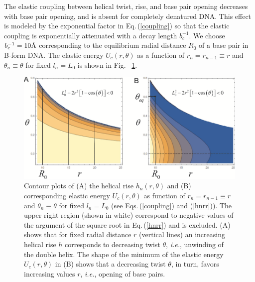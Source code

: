 \documentclass[12pt,masters,final]{UTRGVthesis}
\begin{document}
  The elastic coupling between helical twist, rise, and base pair opening decreases with
  base pair opening, and is absent for completely denatured DNA. This effect is modeled by
  the exponential factor in Eq.\,(\ref{coupling}) so that the elastic coupling
  is exponentially attenuated with a decay length $b_c^{-1}$.
  We choose $b_c^{-1} = 10 \text{\normalfont\AA}$ corresponding to the equilibrium radial distance $R_0$
  of a base pair in B-form DNA. The elastic energy $U_c(r,\theta)$ as a function of 
  $r_n = r_{n-1} \equiv r$ and $\theta_n \equiv \theta$ for fixed $l_n = L_0$ is shown in Fig.~
  \ref{fig:h_and_elastic_energy}.
   \begin{figure}[!h]
    \includegraphics[width=1\textwidth]{h_and_elastic_energy.eps}
    \caption{Contour plots of (A) the helical rise $h_n\left(r,\theta\right)$ and (B) corresponding elastic
      energy $U_c\left(r,\theta\right)$ as function of $r_n = r_{n-1} \equiv r$ and $\theta_n \equiv \theta$
      for fixed $l_n = L_0$ (see Eqs.\,(\ref{coupling}) and (\ref{hnrr})).
      The upper right region (shown in white) correspond to negative values of the argument of the
      square root in Eq.\,(\ref{hnrr}) and is excluded.
      (A) shows that for fixed radial distance $r$ (vertical lines) an increasing helical rise $h$
      corresponds to decreasing twist $\theta$, {\em i.e.}, unwinding of the double helix.
      The shape of the minimum of the elastic energy $U_c\left(r,\theta\right)$ in (B) shows that a decreasing
      twist $\theta$, in turn, favors increasing values $r$, {\em i.e.}, opening of base pairs.}
    \label{fig:h_and_elastic_energy}
  
  \end{figure}
%
\newpage
\end{document}

